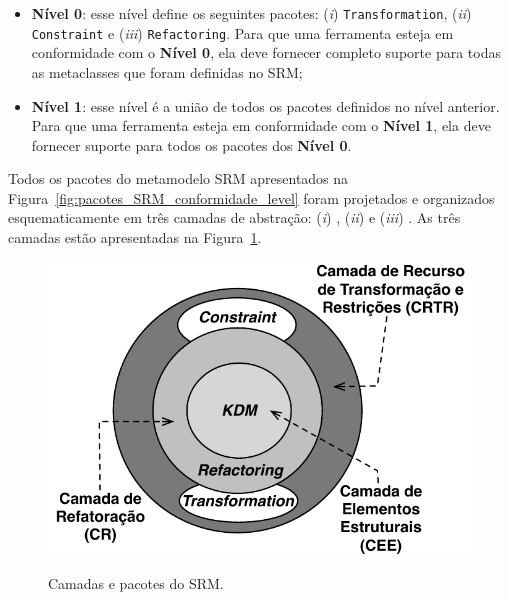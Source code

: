 \begin{itemize}
    \item \textbf{Nível 0}: esse nível define os seguintes pacotes: (\textit{i}) \texttt{Transformation}, (\textit{ii}) \texttt{Constraint} e (\textit{iii}) \texttt{Refactoring}. Para que uma ferramenta esteja em conformidade com o \textbf{Nível 0}, ela deve fornecer completo suporte para todas as metaclasses que foram definidas no SRM;
    
    \item \textbf{Nível 1}: esse nível é a união de todos os pacotes definidos no nível anterior. Para que uma ferramenta esteja em conformidade com o \textbf{Nível 1}, ela deve fornecer suporte para todos os pacotes dos \textbf{Nível 0}.
\end{itemize}

Todos os pacotes do metamodelo SRM apresentados na Figura~\ref{fig:pacotes_SRM_conformidade_level} foram projetados e organizados esquematicamente em três camadas de abstração: (\textit{i}) , (\textit{ii})  e (\textit{iii}) . As três camadas estão apresentadas na Figura~\ref{fig:camadas_e_pacotes_do_srm}.

\begin{figure}[h]
	\centering
		\caption{Camadas e pacotes do SRM.}
	\includegraphics[scale=0.77]{images/LayerSRM}
	\label{fig:camadas_e_pacotes_do_srm}
	\fautor
\end{figure}

